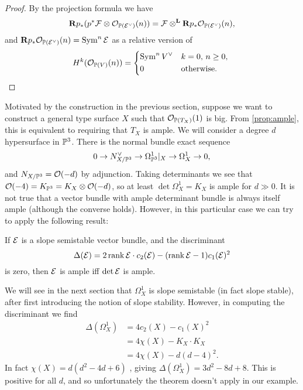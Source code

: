 \begin{proof}
    By the projection formula we have
    \begin{equation*}
        \dR p_*(p^*\calF\otimes\O_{\P(\calE^\vee)}(n))
            = \calF\otimes^\dL\dR p_*\O_{\P(\calE^\vee)}(n),
    \end{equation*}
    and $\dR p_*\O_{\P(\calE^\vee)}(n)=\Sym^n\calE$ as a relative version of
    \begin{equation*}
        H^k(\O_{\P(V)}(n)) = \begin{dcases*}
            \Sym^nV^\vee & $k=0$, $n\ge0$, \\
            0 & otherwise.
        \end{dcases*}
    \end{equation*}
\end{proof}

Motivated by the construction in the previous section, suppose we want to
construct a general type surface $X$ such that $\O_{\P(T_X)}(1)$ is big. From
\cref{prop:ample}, this is equivalent to requiring that $T_X$ is ample. We will
consider a degree $d$ hypersurface in $\P^3$. There is the normal bundle exact
sequence
\begin{equation*}
    0 \to N_{X/\P^3}^\vee \to \Omega^1_{\P^3}|_X \to \Omega^1_X \to 0,
\end{equation*}
and $N_{X/\P^3}=\O(-d)$ by adjunction. Taking determinants we see that
$\O(-4)=K_{\P^3}=K_X\otimes\O(-d)$, so at least $\det\Omega^1_X=K_X$ is ample
for $d\gg0$. It is not true that a vector bundle with ample determinant bundle
is always itself ample (although the converse holds). However, in this
particular case we can try to apply the following result:

\begin{theorem}\label{thm:stable ample}
    If $\calE$ is a slope semistable vector bundle, and the discriminant
    \begin{equation*}
        \Delta(\calE)
            = 2\rank\calE\cdot c_2(\calE) - (\rank\calE-1)c_1(\calE)^2
    \end{equation*}
    is zero, then $\calE$ is ample iff $\det\calE$ is ample.
\end{theorem}

We will see in the next section that $\Omega^1_X$ is slope semistable (in fact
slope stable), after first introducing the notion of slope stability. However,
in computing the discriminant we find
\begin{align*}
    \Delta(\Omega^1_X)
        &= 4c_2(X) - c_1(X)^2 \\
        &= 4\chi(X) - K_X\cdot K_X \\
        &= 4\chi(X) - d(d-4)^2.
\end{align*}
In fact $\chi(X)=d(d^2-4d+6)$ \cite{maxim_24}, giving
$\Delta(\Omega^1_X)=3d^2-8d+8$. This is positive for all $d$, and so
unfortunately the theorem doesn't apply in our example.

